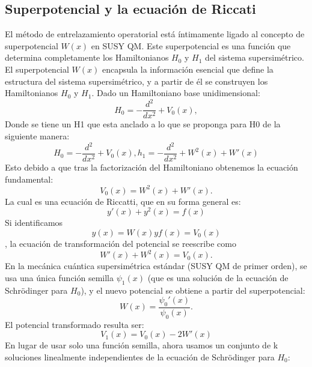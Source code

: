 \documentclass[%
 aip,
 jmp,%
 amsmath,amssymb,
 reprint,
]{revtex4-2}
\begin{document}
\subsection{Superpotencial y la ecuación de Riccati}
El método de entrelazamiento operatorial está íntimamente ligado al concepto de superpotencial \( W(x) \) en SUSY QM. Este superpotencial es una función que determina completamente los Hamiltonianos \( H_0 \) y \( H_1 \) del sistema supersimétrico. 
El superpotencial \( W(x) \) encapsula la información esencial que define la estructura del sistema supersimétrico, y a partir de él se construyen los Hamiltonianos \( H_0 \) y \( H_1 \).
Dado un Hamiltoniano base unidimensional:
\begin{equation}
H_0 = -\frac{d^2}{dx^2} + V_0(x),
\end{equation}
Donde se tiene un H1 que esta anclado a lo que se proponga para H0 de la siguiente manera:
\begin{equation}
H_0 = -\frac{d^2}{dx^2} + V_0(x),
h_1 = -\frac{d^2}{dx^2} + W^2(x) + W'(x)
\end{equation}
Esto debido a que tras la factorización del Hamiltoniano obtenemos la ecuación fundamental: 
\begin{equation}
V_0(x) = W^2(x) + W'(x).
\end{equation}
La cual es una ecuación de Riccatti, que en su forma general es: 
\begin{equation}
y'(x) + y^2(x) = f(x)
\end{equation}
Si identificamos
\begin{equation}
y(x) = W(x) y f(x) = V_0(x)
\end{equation}
, la ecuación de transformación del potencial se reescribe como
\begin{equation}
W'(x) + W^2(x) = V_0(x).
\end{equation}
En la mecánica cuántica supersimétrica estándar (SUSY QM de primer orden), se usa una única función semilla \( \psi_1(x) \) (que es una solución de la ecuación de Schrödinger para \( H_0 \)), y el nuevo potencial se obtiene a partir del superpotencial:
\begin{equation}
W(x) = \frac{\psi_0'(x)}{\psi_0(x)}.
\end{equation}
El potencial transformado resulta ser:
\begin{equation}
V_1(x) = V_0(x) - 2W'(x)
\end{equation}
En lugar de usar solo una función semilla, ahora usamos un conjunto de k soluciones linealmente independientes de la ecuación de Schrödinger para \( H_0 \):
\end{document}
